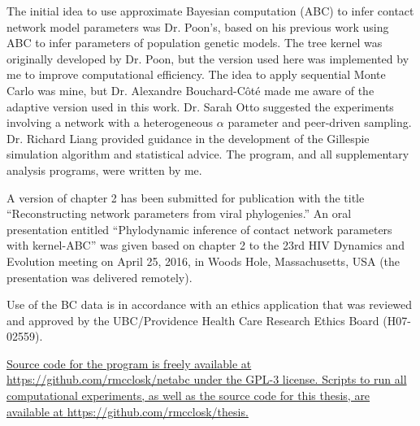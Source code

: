 The initial idea to use approximate Bayesian computation (ABC) to infer contact
network model parameters was Dr. Poon's, based on his previous work using ABC
to infer parameters of population genetic models. The tree kernel was
originally developed by Dr. Poon, but the version used here was implemented by
me to improve computational efficiency. The idea to apply sequential Monte
Carlo was mine, but Dr. Alexandre Bouchard-C\^ot\'e made me aware of the
adaptive version used in this work. Dr. Sarah Otto suggested the experiments
involving a network with a heterogeneous $\alpha$ parameter and peer-driven
sampling. Dr. Richard Liang provided guidance in the development of the
Gillespie simulation algorithm and statistical advice. The 
program, and all supplementary analysis programs, were written by me.

A version of chapter 2 has been submitted for publication with the title
``Reconstructing network parameters from viral phylogenies.'' An oral
presentation entitled ``Phylodynamic inference of contact network parameters
with kernel-ABC'' was given based on chapter 2 to the 23rd HIV Dynamics and
Evolution meeting on April 25, 2016, in Woods Hole, Massachusetts, USA (the
presentation was delivered remotely). 

Use of the BC data is in accordance with an ethics application that was
reviewed and approved by the UBC/Providence Health Care Research Ethics Board
(H07-02559).

{\color{blue}\uline{Source code for the  program is freely
available at \url{https://github.com/rmcclosk/netabc} under the GPL-3 license.
Scripts to run all computational experiments, as well as the source code for
this thesis, are available at \url{https://github.com/rmcclosk/thesis}.}}
